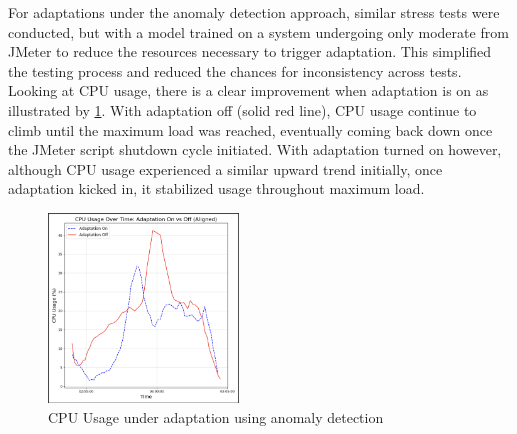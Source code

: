\documentclass[conference]{IEEEtran}
\begin{document}
For adaptations under the anomaly detection approach, similar stress tests were conducted, but with a model trained on a system undergoing only moderate from JMeter to reduce the resources necessary to trigger adaptation. This simplified the testing process and reduced the chances for inconsistency across tests. Looking at CPU usage, there is a clear improvement when adaptation is on as illustrated by \ref{fig:anomaly_test_CPU}. With adaptation off (solid red line), CPU usage continue to climb until the maximum load was reached, eventually coming back down once the JMeter script shutdown cycle initiated. With adaptation turned on however, although CPU usage experienced a similar upward trend initially, once adaptation kicked in, it stabilized usage throughout maximum load.

\begin{figure}[H]
    \centering
    \includegraphics[width=0.45\textwidth]{./media/anomaly_test_CPU.png}
    \caption{CPU Usage under adaptation using anomaly detection}
    \label{fig:anomaly_test_CPU}
\end{figure}
\end{document}
